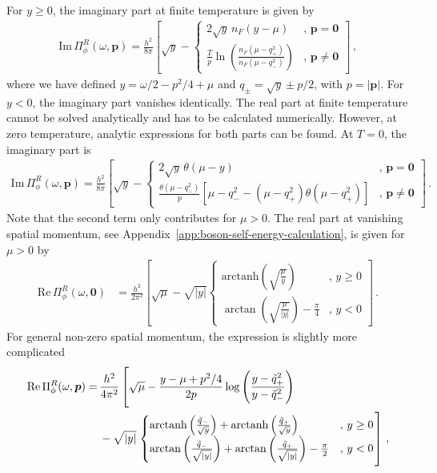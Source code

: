 For $y\geq 0$, the imaginary part at finite temperature is given by
%
\begin{align}
	\label{eq:boson-imaginary-part-finite-temp}
	\text{Im}\,\Pi^R_{\phi}(\omega,\bm{p}) = \frac{h^2}{8\pi} \left[ \sqrt{y} -
	\begin{cases}
		2\sqrt{y}\,n_F\left(y-\mu\right) & ,\, \bm{p}=\bm{0} \\
		\frac{T}{p} \ln\left( \frac{n_F(\mu-q_{+}^2)}{n_F(\mu-q_{-}^2)} \right) & ,\, \bm{p}\neq\bm{0}
	\end{cases} \right] \,,
\end{align}
%
where we have defined $y=\omega/2-p^2/4+\mu$ and $q_{\pm} = \sqrt{y}\pm p/2$, with $p=|\bm{p}|$. For $y<0$, the imaginary part vanishes identically. The real part at finite temperature cannot be solved analytically and has to be calculated numerically. However, at zero temperature, analytic expressions for both parts can be found. At $T=0$, the imaginary part is
%
\begin{align}
	\label{eq:boson-imaginary-part-zero-temp}
	\text{Im}\,\Pi^R_{\phi}(\omega,\bm{p}) = \frac{h^2}{8\pi} \left[ \sqrt{y} -
	\begin{cases}
		2\sqrt{y}\,\theta\left(\mu-y\right) & ,\, \bm{p}=\bm{0} \\
		\frac{\theta\left( \mu-
			q_{-}^2 \right)}{p} \left[
		\mu-q_{-}^2 -
		\left(\mu-q_{+}^2\right)
		\theta\left( \mu-q_{+}^2 \right)
		\right] & ,\, \bm{p}\neq\bm{0}
	\end{cases} \right] \,.
\end{align}
%
Note that the second term only contributes for $\mu>0$. The real part at vanishing spatial momentum, see Appendix~\ref{app:boson-self-energy-calculation}, is given for $\mu>0$ by
%
\begin{align}
	\label{eq:boson-real-part-zero-momentum}
	\text{Re}\, \Pi^R_{\phi}(\omega,\bm{0}) &= \frac{h^2}{2\pi^2} \left[ \sqrt{\mu} - \sqrt{|y|}
	\begin{cases}
		\text{arctanh}\left(\sqrt{\frac{\mu}{y}}\right) & ,\, y \geq 0 \\
		\arctan\left( \sqrt{\frac{\mu}{|y|}}\right)-\frac{\pi}{4} & ,\, y < 0
	\end{cases} \right]	\,.
\end{align}
%
For general non-zero spatial momentum, the expression is slightly more complicated
\begin{align}
	\label{eq:boson-real-part-general-momentum}
	\text{Re}\, \Pi^R_{\phi}(\omega,\bm{p}) =\,
	&\frac{h^2}{4\pi^2} \left[
	\sqrt{\mu} - \frac{y-\mu+p^2/4}{2p}\log\left(\frac{y-\tilde{q}^2_{+}}{y-\tilde{q}^2_{-}}\right)\right. \notag \\
	&- \sqrt{|y|}\left.
	\begin{cases}
		\text{arctanh}\left(\frac{\tilde{q}_{-}}{\sqrt{y}}\right) + 
		\text{arctanh}\left(\frac{\tilde{q}_{+}}{\sqrt{y}}\right) & ,\, y \geq 0 \\
		\text{arctan}\left(\frac{\tilde{q}_{-}}{\sqrt{|y|}}\right) +
		\text{arctan}\left(\frac{\tilde{q}_{+}}{\sqrt{|y|}}\right)-\frac{\pi}{2} & ,\, y < 0
	\end{cases}
	\right] \,,
\end{align}

